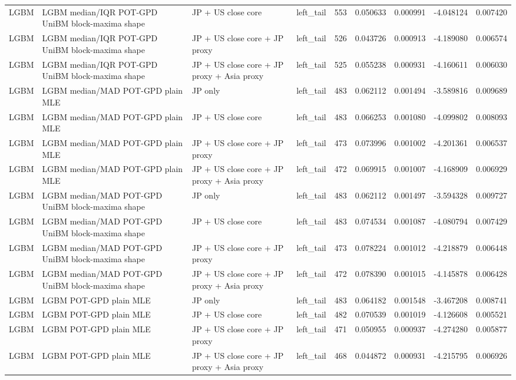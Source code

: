 \begin{tabular}{lll lrrrrr}
LGBM & LGBM median/IQR POT-GPD UniBM block-maxima shape & JP + US close core & left\_tail & 553 & 0.050633 & 0.000991 & -4.048124 & 0.007420 \\
LGBM & LGBM median/IQR POT-GPD UniBM block-maxima shape & JP + US close core + JP proxy & left\_tail & 526 & 0.043726 & 0.000913 & -4.189080 & 0.006574 \\
LGBM & LGBM median/IQR POT-GPD UniBM block-maxima shape & JP + US close core + JP proxy + Asia proxy & left\_tail & 525 & 0.055238 & 0.000931 & -4.160611 & 0.006030 \\
LGBM & LGBM median/MAD POT-GPD plain MLE & JP only & left\_tail & 483 & 0.062112 & 0.001494 & -3.589816 & 0.009689 \\
LGBM & LGBM median/MAD POT-GPD plain MLE & JP + US close core & left\_tail & 483 & 0.066253 & 0.001080 & -4.099802 & 0.008093 \\
LGBM & LGBM median/MAD POT-GPD plain MLE & JP + US close core + JP proxy & left\_tail & 473 & 0.073996 & 0.001002 & -4.201361 & 0.006537 \\
LGBM & LGBM median/MAD POT-GPD plain MLE & JP + US close core + JP proxy + Asia proxy & left\_tail & 472 & 0.069915 & 0.001007 & -4.168909 & 0.006929 \\
LGBM & LGBM median/MAD POT-GPD UniBM block-maxima shape & JP only & left\_tail & 483 & 0.062112 & 0.001497 & -3.594328 & 0.009727 \\
LGBM & LGBM median/MAD POT-GPD UniBM block-maxima shape & JP + US close core & left\_tail & 483 & 0.074534 & 0.001087 & -4.080794 & 0.007429 \\
LGBM & LGBM median/MAD POT-GPD UniBM block-maxima shape & JP + US close core + JP proxy & left\_tail & 473 & 0.078224 & 0.001012 & -4.218879 & 0.006448 \\
LGBM & LGBM median/MAD POT-GPD UniBM block-maxima shape & JP + US close core + JP proxy + Asia proxy & left\_tail & 472 & 0.078390 & 0.001015 & -4.145878 & 0.006428 \\
LGBM & LGBM POT-GPD plain MLE & JP only & left\_tail & 483 & 0.064182 & 0.001548 & -3.467208 & 0.008741 \\
LGBM & LGBM POT-GPD plain MLE & JP + US close core & left\_tail & 482 & 0.070539 & 0.001019 & -4.126608 & 0.005521 \\
LGBM & LGBM POT-GPD plain MLE & JP + US close core + JP proxy & left\_tail & 471 & 0.050955 & 0.000937 & -4.274280 & 0.005877 \\
LGBM & LGBM POT-GPD plain MLE & JP + US close core + JP proxy + Asia proxy & left\_tail & 468 & 0.044872 & 0.000931 & -4.215795 & 0.006926 \\

\end{tabular}
